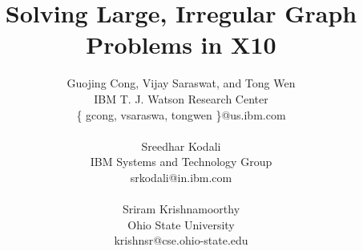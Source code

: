 \documentclass[12pt]{article}
\numberwithin{equation}{section}
\begin{document}
\title{Solving Large, Irregular Graph Problems in X10}

\author{
Guojing Cong,  Vijay Saraswat, and Tong Wen\\
IBM T. J. Watson Research Center\\
 \{ gcong, vsaraswa, tongwen \}@us.ibm.com\\ 
\vspace*{-2ex} \\
Sreedhar Kodali\\
IBM Systems and Technology Group\\
srkodali@in.ibm.com\\
\vspace*{-2ex} \\
Sriram Krishnamoorthy \\
Ohio State University\\
krishnsr@cse.ohio-state.edu
\vspace*{-3ex} \\
}

\date{}

\maketitle
\thispagestyle{empty}












{\footnotesize


}
\end{document}
